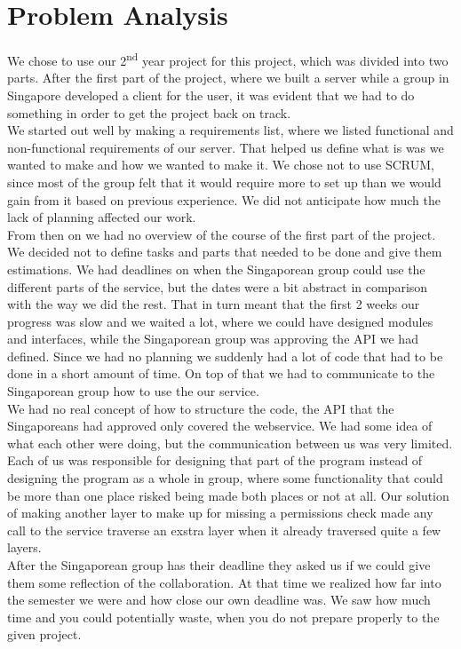 \section{Problem Analysis}
We chose to use our 2\textsuperscript{nd} year project for this project, which was divided into two parts. After the first part of the project, where we built a server while a group in Singapore developed a client for the user, it was evident that we had to do something in order to get the project back on track.\\
We started out well by making a requirements list, where we listed functional and non-functional requirements of our server. That helped us define what is was we wanted to make and how we wanted to make it. We chose not to use SCRUM, since most of the group felt that it would require more to set up than we would gain from it based on previous experience. We did not anticipate how much the lack of planning affected our work.\\
From then on we had no overview of the course of the first part of the project. We decided not to define tasks and parts that needed to be done and give them estimations. We had deadlines on when the Singaporean group could use the different parts of the service, but the dates were a bit abstract in comparison with the way we did the rest. That in turn meant that the first 2 weeks our progress was slow and we waited a lot, where we could have designed modules and interfaces, while the Singaporean group was approving the API we had defined. Since we had no planning we suddenly had a lot of code that had to be done in a short amount of time. On top of that we had to communicate to the Singaporean group how to use the our service.\\ 
We had no real concept of how to structure the code, the API that the Singaporeans had approved only covered the webservice. We had some idea of what each other were doing, but the communication between us was very limited. Each of us was responsible for designing that part of the program instead of designing the program as a whole in group, where some functionality that could be more than one place risked being made both places or not at all. Our solution of making another layer to make up for missing a permissions check made any call to the service traverse an exstra layer when it already traversed quite a few layers.\\
After the Singaporean group has their deadline they asked us if we could give them some reflection of the collaboration. At that time we realized how far into the semester we were and how close our own deadline was. We saw how much time and you could potentially waste, when you do not prepare properly to the given project.
\newpage